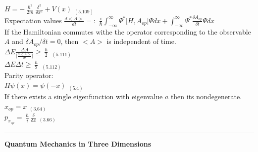 \documentclass[0pt]{report}
\begin{document}
\begin{multicols*}{3}
\begin{flushleft}
$H=-\frac{\hslash^2}{2m}\frac{\delta^2}{\delta x^2}+V(x)$ $_{(5.109)}$\\
Expectation values $\frac{d\big<A\big>}{dt}=:$
$\frac{i}{\hslash}\int_{-\infty}^{\infty}\Psi^*\big[H,A_{op}\big]\Psi dx+\int_{-\infty}^{\infty}\Psi^*\frac{\delta A_{op}}{\delta t}\Psi dx$\\
If the Hamiltonian commutes withe the operator corresponding to the observable $A$ and $\delta A_{op}/\delta t=0$, then $\big<A\big>$ is independent of time.\\
$\Delta E\frac{\Delta A}{\big|\frac{d<A>}{dt}\big|}\geq\frac{\hslash}{2}$ $_{(5.111)}$\\
$\Delta E\Delta t\geq\frac{\hslash}{2}$ $_{(5.112)}$\\
Parity operator:\\
$\Pi\psi(x)=\psi(-x)$ $_{(5.4)}$\\
If there exists a single eigenfunction with eigenvalue $a$ then its nondegenerate.
$x_{op}=x$ $_{(3.64)}$\\
$p_{x_{op}}=\frac{\hslash}{i}\frac{\delta}{\delta x}$ $_{(3.66)}$\\
\noindent\rule[0.5ex]{\linewidth}{1pt}
\textbf{Quantum Mechanics in Three Dimensions}\\



\end{flushleft}
\end{multicols*}
\end{document}
